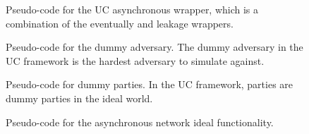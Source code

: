 %


\begin{figure}
\centering
	
	\caption{Pseudo-code for the UC asynchronous wrapper, which is a combination of the eventually and leakage wrappers.}
	\label{fig:wrapper_async_new}
\end{figure}

\begin{figure}
\centering
	
	\caption{Pseudo-code for the dummy adversary. The dummy adversary in the UC framework is the hardest adversary to simulate against.}
	\label{fig:dummy_adversary}
\end{figure}

\begin{figure}
\centering
	
	\caption{Pseudo-code for dummy parties. In the UC framework, parties are dummy parties in the ideal world.}
	\label{fig:dummy_party}
\end{figure}

\begin{figure}
\centering
	
	\caption{Pseudo-code for the asynchronous network ideal functionality.}
	\label{fig:f_async_explicit}
\end{figure}

